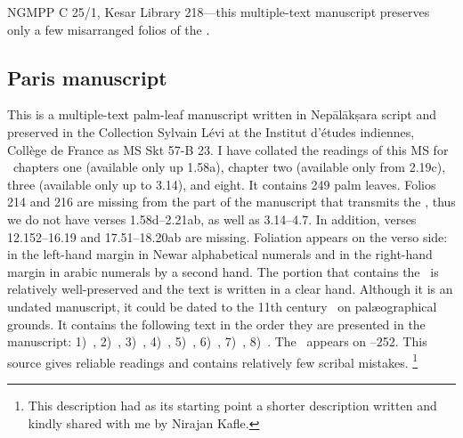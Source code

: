 NGMPP C 25/1, Kesar Library 218---this multiple-text manuscript
preserves only a few misarranged folios of the \VSS.

\medskip
\subsection{Paris manuscript}

This is a multiple-text palm-leaf manuscript written in 
Nepālā\-kṣara script and preserved in the 
Collection Sylvain Lévi at the Institut d'études
indiennes, Collège de France as MS Skt 57-B 23. 
I have collated the readings of this MS for \VSS\ 
chapters one (available only up 1.58a), 
chapter two (available only from 2.19c),
three (available only up to 3.14),
and eight. %
It contains 249 palm leaves. %
Folios 214 and 216 are missing from the 
part of the manuscript that transmits the \VSS,
thus we do not have verses 1.58d--2.21ab, as well as
3.14--4.7. In addition, verses 12.152--16.19 and 17.51--18.20ab are missing.
Foliation appears on the verso side: in the left-hand margin in
Newar alphabetical numerals and in the right-hand margin 
in arabic numerals by a second hand. 
The portion that contains the \VSS\ is relatively well-preserved and
the text is written in a clear hand. Although it is an undated manuscript,
it could be dated to the 11th century \CE\ on 
pal{\ae}ographical grounds. 
It contains the following text in the order they are presented in the manuscript:
1)~\SDhS, %
2)~\SDhU, %
3)~\SDhSangr, %
4)~\Ums, %
5)~\SivaUp, %
6)~\Uums, %
7)~\Vss, %
8)~\DharmP. %
The \VSS\ appears on --252.
This source gives reliable readings and contains
relatively few scribal mistakes.%
	\footnote{This description had as its starting 
	point a shorter description written and kindly shared with me by Nirajan Kafle.}





